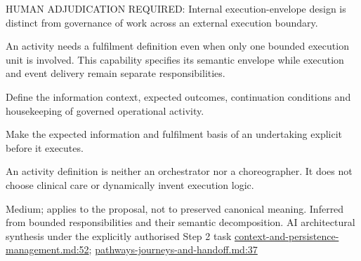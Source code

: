 HUMAN ADJUDICATION REQUIRED: Internal execution-envelope design is distinct from governance of work across an external execution boundary.



An activity needs a fulfilment definition even when only one bounded execution unit is involved. This capability specifies its semantic envelope while execution and event delivery remain separate responsibilities.



Define the information context, expected outcomes, continuation conditions and housekeeping of governed operational activity.



Make the expected information and fulfilment basis of an undertaking explicit before it executes.



An activity definition is neither an orchestrator nor a choreographer. It does not choose clinical care or dynamically invent execution logic.


Medium; applies to the proposal, not to preserved canonical meaning.
Inferred from bounded responsibilities and their semantic decomposition. AI architectural synthesis under the explicitly authorised Step 2 task \hyperref[evidence:ea0c62dfd5edfd4a]{context-and-persistence-management.md:52}; \hyperref[evidence:cb9909df0650a902]{pathways-journeys-and-handoff.md:37}
